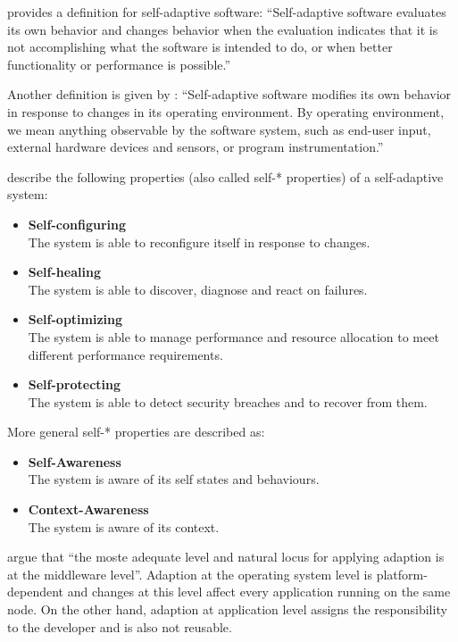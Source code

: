 \citet{Laddaga:2008ff} provides a definition for self-adaptive software: ``Self-adaptive software evaluates its own behavior and changes behavior when the evaluation indicates that it is not accomplishing what the software is intended to do, or when better functionality or performance is possible.'' 

Another definition is given by \citet{Oreizy:1999lh}: ``Self-adaptive software modifies its own behavior in response to changes in its operating environment. By operating environment, we mean anything observable by the software system, such as end-user input, external hardware devices and sensors, or program instrumentation.''

\cite{Salehie:2009pi} describe the following properties (also called self-* properties) of a self-adaptive system:
\begin{itemize}
	\item \textbf{Self-configuring}\\
	The system is able to reconfigure itself in response to changes.
	\item \textbf{Self-healing}\\
	The system is able to discover, diagnose and react on failures.
	\item \textbf{Self-optimizing}\\
	The system is able to manage performance and resource allocation to meet different performance requirements.
	\item \textbf{Self-protecting}\\
	The system is able to detect security breaches and to recover from them.
\end{itemize}

More general self-* properties are described as:
\begin{itemize}
	\item \textbf{Self-Awareness}\\
	The system is aware of its self states and behaviours.
	\item \textbf{Context-Awareness}\\
	The system is aware of its context.
\end{itemize}

\citet{Duran-Limon:2004mi} argue that ``the moste adequate level and natural locus for applying adaption is at the middleware level''. Adaption at the operating system level is platform-dependent and changes at this level affect every application running on the same node. On the other hand, adaption at application level assigns the responsibility to the developer and is also not reusable.

